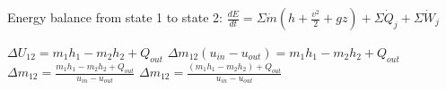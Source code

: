 Energy balance from state 1 to state 2:  
\( \frac{dE}{dt} = \Sigma \dot{m} (h + \frac{v^2}{2} + gz) + \Sigma \dot{Q}_j + \Sigma \dot{W}_j \)  

\( \Delta U_{12} = m_1 h_1 - m_2 h_2 + Q_{out} \)  
\( \Delta m_{12} (u_{in} - u_{out}) = m_1 h_1 - m_2 h_2 + Q_{out} \)  
\( \Delta m_{12} = \frac{m_1 h_1 - m_2 h_2 + Q_{out}}{u_{in} - u_{out}} \)  
\( \Delta m_{12} = \frac{(m_1 h_1 - m_2 h_2) + Q_{out}}{u_{in} - u_{out}} \)
